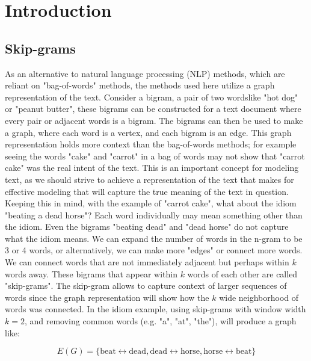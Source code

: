 %
%
%

\section{Introduction}


\subsection{ Skip-grams}
\hspace*{0.5cm} As an alternative to natural language processing (NLP) methods, which are reliant on "bag-of-words" methods, the methods used here utilize a graph representation of the text. Consider a bigram, a pair of two words\textemdash like "hot dog" or "peanut butter", these bigrams can be constructed for a text document where every pair or adjacent words is a bigram. The bigrams can then be used to make a graph, where each word is a vertex, and each bigram is an edge. This graph representation holds more context than the bag-of-words methods; for example seeing the words "cake" and "carrot" in a bag of words may not show that "carrot cake" was the real intent of the text. This is an important concept for modeling text, as we should strive to achieve a representation of the text that makes for effective modeling that will capture the true meaning of the text in question. Keeping this in mind, with the example of "carrot cake", what about the idiom "beating a dead horse"? Each word individually may mean something other than the idiom. Even the bigrams "beating dead" and "dead horse" do not capture what the idiom means. We can expand the number of words in the n-gram to be 3 or 4 words, or alternatively, we can make more "edges" or connect more words. We can connect words that are not immediately adjacent but perhaps within $k$ words away. These bigrams that appear within $k$ words of each other are called "skip-grams". The skip-gram allows to capture context of larger sequences of words since the graph representation will show how the $k$ wide neighborhood of words was connected. In the idiom example, using skip-grams with window width $k = 2$, and removing common words (e.g. "a", "at", "the"), will produce a graph like: 

$$
E(G) = \{
\text{beat}  \longleftrightarrow \text{dead}, 
\text{dead}  \longleftrightarrow \text{horse}, 
\text{horse}  \longleftrightarrow \text{beat} \}
$$

